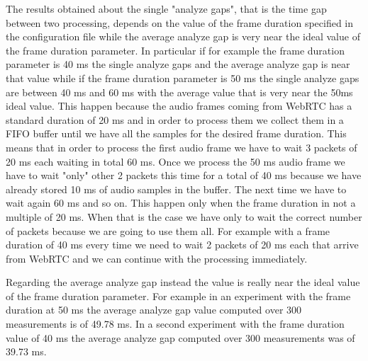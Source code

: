 \documentclass[../main.tex]{subfiles}
\begin{document}
The results obtained about the single "analyze gaps", that is the time gap between two processing, depends on the value of the frame duration specified in the configuration file while the average analyze gap is very near the ideal value of the frame duration parameter. In particular if for example the frame duration parameter is 40 ms the single analyze gaps and the average analyze gap is near that value while if the frame duration parameter is 50 ms the single analyze gaps are between 40 ms and 60 ms with the average value that is very near the 50ms ideal value. This happen because the audio frames coming from WebRTC has a standard duration of 20 ms and in order to process them we collect them in a FIFO buffer until we have all the samples for the desired frame duration. This means that in order to process the first audio frame we have to wait 3 packets of 20 ms each waiting in total 60 ms. Once we process the 50 ms audio frame we have to wait "only" other 2 packets this time for a total of 40 ms because we have already stored 10 ms of audio samples in the buffer. The next time we have to wait again 60 ms and so on. This happen only when the frame duration in not a multiple of 20 ms. When that is the case we have only to wait the correct number of packets because we are going to use them all. For example with a frame duration of 40 ms every time we need to wait 2 packets of 20 ms each that arrive from WebRTC and we can continue with the processing immediately. 

Regarding the average analyze gap instead the value is really near the ideal value of the frame duration parameter. For example in an experiment with the frame duration at 50 ms the average analyze gap value computed over 300 measurements is of 49.78 ms. In a second experiment with the frame duration value of 40 ms the average analyze gap computed over 300 measurements was of 39.73 ms. 
\end{document}
